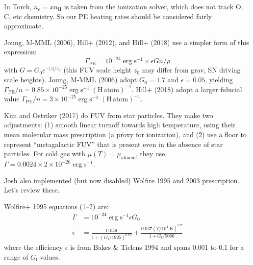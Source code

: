 \documentclass[10pt]{article}
\newcommand*{\mt}{\mathrm}
\newcommand*{\unit}[1]{\;\mt{#1}}  %
\begin{document}


In Torch, $n_e = x n_\mt{H}$ is taken from the ionization solver, which does
not track O, C, etc chemistry.  So our PE heating rates should be considered
fairly approximate.

Joung, M-MML (2006), Hill+ (2012), and Hill+ (2018) use a simpler form of this
expression:
\[
    \Gamma_\mt{PE} = 10^{-24} \unit{erg\;s^{-1}} \times \epsilon G n / \rho
\]
with $G = G_0 e^{-|z| / z_{0}}$ (this FUV scale height $z_0$ may differ from
grav, SN driving scale heights).
Joung, M-MML (2006) adopt $G_0 = 1.7$ and $\epsilon = 0.05$, yielding
$\Gamma_\mt{PE}/n = 0.85 \times 10^{-25} \unit{erg\;s^{-1}\;(H\,atom)^{-1}}$.
Hill+ (2018) adopt a larger fiducial value
$\Gamma_\mt{PE}/n = 3 \times 10^{-25} \unit{erg\;s^{-1}\;(H\,atom)^{-1}}$.

Kim and Ostriker (2017) do FUV from star particles.
They make two adjustments: (1) smooth linear turnoff towards high temperature,
using their mean molecular mass prescription (a proxy for ionization), and (2)
use a floor to represent ``metagalactic FUV'' that is present even in the
absence of star particles.  For cold gas with $\mu(T) = \mu_\mt{atomic}$, they
use $\Gamma = 0.0024 \times 2 \times 10^{-26} \unit{erg\;s^{-1}}$.

Josh also implemented (but now disabled) Wolfire 1995 and 2003 prescription.
Let's review these.

Wolfire+ 1995 equations (1--2) are:
\begin{align*}
    \Gamma &= 10^{-24} \unit{erg\;s^{-1}} \epsilon G_0 \\
    \epsilon
    &= \frac{0.049}{1 + \left( G_\mt{f} / 1925 \right)^{0.73}}
    + \frac{0.037 \left(T/10^4\unit{K}\right)^{0.7}}{1 + G_\mt{f} / 5000}
\end{align*}
where the efficiency $\epsilon$ is from Bakes \& Tielens 1994 and spans 0.001
to 0.1 for a range of $G_\mt{f}$ values.
\end{document}
